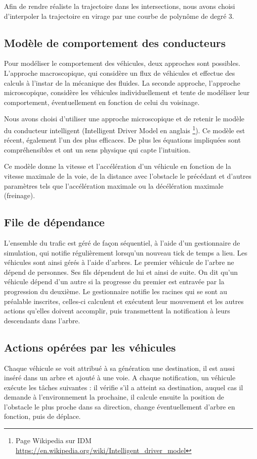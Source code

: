 \documentclass[11pt]{article}
\begin{document}
Afin de rendre réaliste la trajectoire dans les intersections, nous avons choisi d'interpoler la trajectoire en virage par une courbe de polynôme de degré 3.

\subsection{Modèle de comportement des conducteurs}
Pour modéliser le comportement des véhicules, deux approches sont possibles. L’approche macroscopique, qui considère un flux de véhicules et effectue des calculs à l'instar de la mécanique des fluides. La seconde approche, l'approche microscopique, considère les véhicules individuellement et tente de modéliser leur comportement, éventuellement en fonction de celui du voisinage. 

Nous avons choisi d'utiliser une approche microscopique et de retenir le modèle du conducteur intelligent (Intelligent Driver Model en anglais \footnote{Page Wikipedia sur IDM \url{https://en.wikipedia.org/wiki/Intelligent_driver_model}}). Ce modèle est récent, également l'un des plus efficaces. De plus les équations impliquées sont compréhensibles et ont un sens physique qui capte l'intuition.

Ce modèle donne la vitesse et l'accélération d'un véhicule en fonction de la vitesse maximale de la voie, de la distance avec l'obstacle le précédant et d'autres paramètres tels que l'accélération maximale ou la décélération maximale (freinage).

\subsection{File de dépendance}
L'ensemble du trafic est géré de façon séquentiel, à l'aide d'un gestionnaire de simulation, qui notifie régulièrement lorsqu'un nouveau \og tick \fg de temps a lieu. Les véhicules sont ainsi gérés à l'aide d'arbres. Le premier véhicule de l'arbre ne dépend de personnes. Ses fils dépendent de lui et ainsi de suite. On dit qu'un véhicule dépend d'un autre si la progresse du premier est entravée par la progression du deuxième. Le gestionnaire notifie les racines qui se sont au préalable inscrites, celles-ci calculent et exécutent leur mouvement et les autres actions qu'elles doivent accomplir, puis transmettent la notification à leurs descendants dans l'arbre. 

\subsection{Actions opérées par les véhicules}
Chaque véhicule se voit attribué à sa génération une destination, il est aussi inséré dans un arbre et ajouté à une voie. A chaque notification, un véhicule exécute les tâches suivantes : il vérifie s'il a atteint sa destination, auquel cas il demande à l'environnement la prochaine, il calcule ensuite la position de l'obstacle le plus proche dans sa direction, change éventuellement d'arbre en fonction, puis de déplace. 
\end{document}

